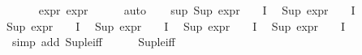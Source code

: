 \begin{isabellebody}
\ \ \ \ \isamarkupfalse%
\ expr{\isacharunderscore}{\kern0pt}{\isasymphi}\ expr{\isacharunderscore}{\kern0pt}{\isasympsi}\isanewline
\ \ \ \ \isamarkupfalse%
\ auto\isanewline
\ \ \isamarkupfalse%
\ sup{\isacharunderscore}{\kern0pt}{\isasymphi}{\isacharcolon}{\kern0pt}\ {\isachardoublequoteopen}Sup\ {\isacharparenleft}{\kern0pt}{\isacharparenleft}{\kern0pt}expr{\isacharunderscore}{\kern0pt}{}\ {\isasymcirc}\ {\isasymPhi}{\isacharparenright}{\kern0pt}\ {\isacharbackquote}{\kern0pt}\ I{\isacharparenright}{\kern0pt}\ {\isasymle}\ {}{\isachardoublequoteclose}\isanewline
{\isachardoublequoteopen}Sup\ {\isacharparenleft}{\kern0pt}{\isacharparenleft}{\kern0pt}expr{\isacharunderscore}{\kern0pt}{}\ {\isasymcirc}\ {\isasymPhi}{\isacharparenright}{\kern0pt}\ {\isacharbackquote}{\kern0pt}\ I{\isacharparenright}{\kern0pt}\ {\isasymle}\ {\isasyminfinity}{\isachardoublequoteclose}\isanewline
{\isachardoublequoteopen}Sup\ {\isacharparenleft}{\kern0pt}{\isacharparenleft}{\kern0pt}expr{\isacharunderscore}{\kern0pt}{}\ {\isasymcirc}\ {\isasymPhi}{\isacharparenright}{\kern0pt}\ {\isacharbackquote}{\kern0pt}\ I{\isacharparenright}{\kern0pt}\ {\isasymle}\ {}{\isachardoublequoteclose}\isanewline
{\isachardoublequoteopen}Sup\ {\isacharparenleft}{\kern0pt}{\isacharparenleft}{\kern0pt}expr{\isacharunderscore}{\kern0pt}{}\ {\isasymcirc}\ {\isasymPhi}{\isacharparenright}{\kern0pt}\ {\isacharbackquote}{\kern0pt}\ I{\isacharparenright}{\kern0pt}\ {\isasymle}\ {}{\isachardoublequoteclose}\isanewline
{\isachardoublequoteopen}Sup\ {\isacharparenleft}{\kern0pt}{\isacharparenleft}{\kern0pt}expr{\isacharunderscore}{\kern0pt}{}\ {\isasymcirc}\ {\isasymPhi}{\isacharparenright}{\kern0pt}\ {\isacharbackquote}{\kern0pt}\ I{\isacharparenright}{\kern0pt}\ {\isasymle}\ {}{\isachardoublequoteclose}\isanewline
{\isachardoublequoteopen}Sup\ {\isacharparenleft}{\kern0pt}{\isacharparenleft}{\kern0pt}expr{\isacharunderscore}{\kern0pt}{}\ {\isasymcirc}\ {\isasymPhi}{\isacharparenright}{\kern0pt}\ {\isacharbackquote}{\kern0pt}\ I{\isacharparenright}{\kern0pt}\ {\isasymle}\ {}{\isachardoublequoteclose}\isanewline
\ \ \ \ \ \ \ \ \ \isamarkupfalse%
\ {\isacharparenleft}{\kern0pt}simp\ add{\isacharcolon}{\kern0pt}\ Sup{\isacharunderscore}{\kern0pt}le{\isacharunderscore}{\kern0pt}iff{\isacharparenright}{\kern0pt}\isanewline
\ \ \ \ \isamarkupfalse%
\ Sup{\isacharunderscore}{\kern0pt}le{\isacharunderscore}{\kern0pt}iff\isanewline

\end{isabellebody}
